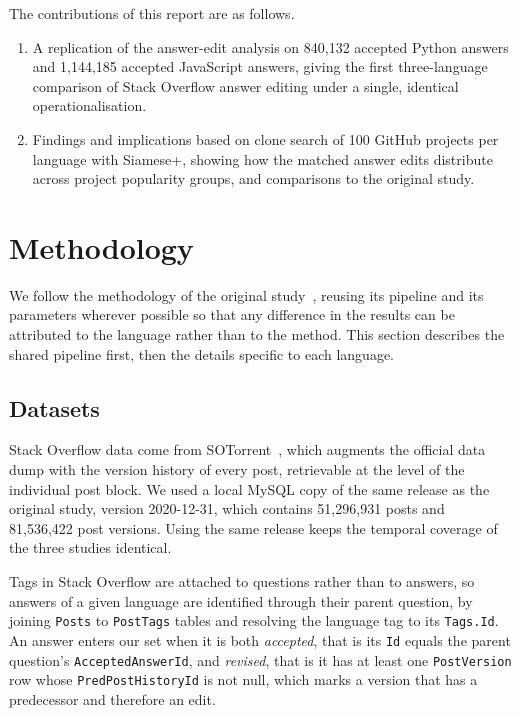 \documentclass[onecolumn,11pt]{IEEEtran}
\begin{document}
The contributions of this report are as follows.

\begin{enumerate}
\item A replication of the answer-edit analysis on 840{,}132 accepted Python answers and 1{,}144{,}185 accepted JavaScript answers, giving the first three-language comparison of Stack Overflow answer editing under a single, identical operationalisation.
\item Findings and implications based on clone search of 100 GitHub projects per language with Siamese+, showing how the matched answer edits distribute across project popularity groups, and comparisons to the original study.
\end{enumerate}

\section{Methodology}

We follow the methodology of the original study~\cite{wiratsin2025java}, reusing its pipeline and its parameters wherever possible so that any difference in the results can be attributed to the language rather than to the method.
This section describes the shared pipeline first, then the details specific to each language.

\subsection{Datasets}

Stack Overflow data come from SOTorrent~\cite{baltes2018sotorrent}, which augments the official data dump with the version history of every post, retrievable at the level of the individual post block.
We used a local MySQL copy of the same release as the original study, version 2020-12-31, which contains 51{,}296{,}931 posts and 81{,}536{,}422 post versions.
Using the same release keeps the temporal coverage of the three studies identical.

Tags in Stack Overflow are attached to questions rather than to answers, so answers of a given language are identified through their parent question, by joining \texttt{Posts} to \texttt{PostTags} tables and resolving the language tag to its \texttt{Tags.Id}.
An answer enters our set when it is both \emph{accepted}, that is its \texttt{Id} equals the parent question's \texttt{AcceptedAnswerId}, and \emph{revised}, that is it has at least one \texttt{PostVersion} row whose \texttt{PredPostHistoryId} is not null, which marks a version that has a predecessor and therefore an edit.
\end{document}
